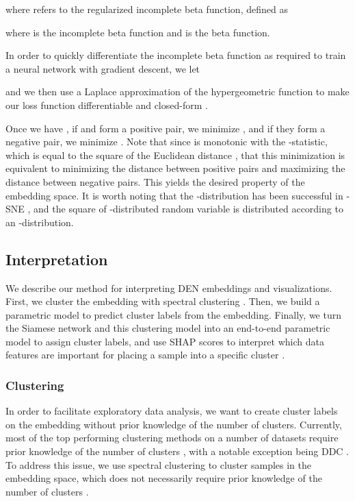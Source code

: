 \documentclass{article}
\begin{document}
where  refers to the regularized incomplete beta function, defined as 
    
where  is the incomplete beta function and  is the beta function.

In order to quickly differentiate the incomplete beta function  as required to train a neural network with gradient descent, we let 
      
and we then use a Laplace approximation of the hypergeometric function  to make our loss function differentiable and closed-form \cite{butler2002laplace}.

Once we have , if  and  form a positive pair, we minimize , and if they form a negative pair, we minimize . Note that since  is monotonic with the -statistic, which is equal to the square of the Euclidean distance , that this minimization is equivalent to minimizing the distance between positive pairs and maximizing the distance between negative pairs. This yields the desired property of the embedding space. It is worth noting that the -distribution has been successful in -SNE \cite{maaten2008visualizing}, and the square of -distributed random variable is distributed according to an -distribution.













\subsection{Interpretation}

We describe our method for interpreting DEN embeddings and visualizations. First, we cluster the embedding with spectral clustering \cite{von2007tutorial}. Then, we build a parametric model to predict cluster labels from the embedding. Finally, we turn the Siamese network and this clustering model into an end-to-end parametric model to assign cluster labels, and use SHAP scores to interpret which data features are important for placing a sample into a specific cluster \cite{NIPS2017_7062}.

\subsubsection{Clustering}

In order to facilitate exploratory data analysis, we want to create cluster labels on the embedding without prior knowledge of the number of clusters. Currently, most of the top performing clustering methods on a number of datasets require prior knowledge of the number of clusters \cite{mcconville2019n2d, mrabah2019deep, shaham2018spectralnet, mukherjee2019clustergan}, with a notable exception being DDC \cite{ren2020deep}. To address this issue, we use spectral clustering to cluster samples in the embedding space, which does not necessarily require prior knowledge of the number of clusters \cite{von2007tutorial}.
\end{document}
